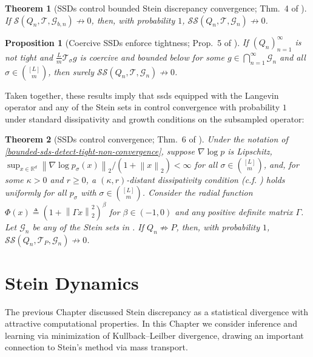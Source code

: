 \documentclass[12pt,paper=letter]{scrreprt}
\newtheorem{theorem}{Theorem}[chapter]
\newtheorem{proposition}{Proposition}[chapter]
\def\defeq{\triangleq} %
\def\norm#1{\left\|{#1}\right\|} %
\newcommand{\twonorm}[1]{\norm{#1}_2} %
\newcommand{\grad}{\nabla} %
\newcommand{\gset}[0]{\mathcal{G}} %
\newcommand{\sset}{\sigma} %
\newcommand{\equisubs}[2]{{[#1]\choose #2}}
\newcommand{\operator}{\mathcal{T}} %
\newcommand{\opsub}[1]{\mathcal{T}_{#1}} %
\newcommand{\langevin}{\mathcal{T}_P} %
\newcommand{\ssdn}[1]{\mathcal{SS}({#1},\operator{},\gset_n)} %
\newcommand{\langssdn}[1]{\mathcal{SS}({#1},\langevin{},\gset_n)} %
\newcommand{\stein}[3]{\mathcal{S}({#1},{#2},{#3})} %
\newcommand{\opstein}[2]{\stein{#1}{\operator{}}{#2}} %
\begin{document}
\begin{theorem}[SSDs control bounded Stein discrepancy convergence; Thm.~4 of \citealp{gorham2020stochastic}]
\label{ssds-detect-bounded-sd-non-convergence}
If $\opstein{Q_n}{\gset_{b,n}} \not\to 0$, then, with probability $1$,
$\ssdn{Q_n} \not\to 0$. 
\end{theorem}


\begin{proposition}[Coercive SSDs enforce tightness; Prop.~5 of \citealp{gorham2020stochastic}]
\label{ssd-tightness}
If $(Q_n)_{n=1}^\infty$ is not tight and $\frac{L}{m}\opsub{\sset} g$ is coercive and bounded below for some $g\in
\bigcap_{n= 1}^\infty \gset_n$ and all $\sset\in\equisubs{L}{m}$, then surely $\ssdn{Q_n} \not\to 0$. %
\end{proposition}

Taken together, these results imply that \acp{ssd} equipped with the Langevin operator and any of the Stein sets in  control convergence with probability $1$ under standard dissipativity and growth conditions on the subsampled operator:

\begin{theorem}[SSDs control convergence; Thm.~6 of \citealp{gorham2020stochastic}]
\label{coercive-ssds-detect-non-convergence}
Under the notation of \cref{bounded-sds-detect-tight-non-convergence}, suppose 
$\grad \log p$ is Lipschitz, $\sup_{x\in \mathbb{R}^d } \twonorm{\grad\log p_{\sset}(x)} / (1 + \twonorm{x}) < \infty$ for all $\sset\in\equisubs{L}{m}$, and, for some $\kappa>0$ and $r\geq 0$, a $(\kappa,r)$-distant dissipativity condition (c.f. ) holds uniformly for all $p_\sigma$ with $\sset\in\equisubs{L}{m}$.
Consider the radial function $\Phi(x) \defeq (1 + \twonorm{\Gamma x}^2)^{\beta}$ for $\beta \in (-1, 0)$ and any positive definite matrix $\Gamma$. 
Let $\mathcal{G}_n$ be any of the Stein sets in .
If $Q_n \not\Rightarrow P$, then, with probability $1$,
$\langssdn{Q_n} \not\to 0$.
\end{theorem}






\chapter{Stein Dynamics} 
\label{chap: Stein dynamics}


The previous Chapter discussed Stein discrepancy as a statistical divergence with attractive computational properties. 
In this Chapter we consider inference and learning via minimization of Kullback--Leilber divergence, drawing an important connection to Stein's method via mass transport. 
\end{document}
